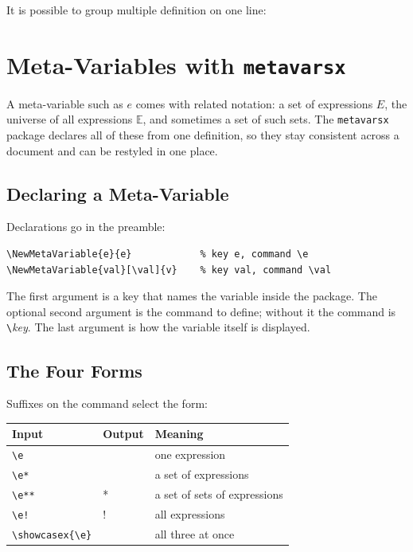 \documentclass{article}
\begin{document}
It is possible to group multiple definition on one line:
\begin{syntax}

\end{syntax}

\section{Meta-Variables with \texttt{metavarsx}}

A meta-variable such as $e$ comes with related notation: a set of
expressions $E$, the universe of all expressions $\mathbb{E}$, and
sometimes a set of such sets. The \texttt{metavarsx} package declares
all of these from one definition, so they stay consistent across a
document and can be restyled in one place.

\subsection{Declaring a Meta-Variable}

Declarations go in the preamble:
\begin{verbatim}
\NewMetaVariable{e}{e}            % key e, command \e
\NewMetaVariable{val}[\val]{v}    % key val, command \val
\end{verbatim}
The first argument is a key that names the variable inside the package.
The optional second argument is the command to define; without it the
command is \verb|\|\textit{key}. The last argument is how the variable
itself is displayed.

\subsection{The Four Forms}

Suffixes on the command select the form:

\begin{center}
  \begin{tabular}{@{}lll@{}}
    \toprule
    Input           & Output         & Meaning \\
    \midrule
    \verb|\e|       & \e             & one expression \\
    \verb|\e*|      & \e*            & a set of expressions \\
    \verb|\e**|     & \e**           & a set of sets of expressions \\
    \verb|\e!|      & \e!            & all expressions \\
    \verb|\showcasex{\e}| & \showcasex{\e} & all three at once \\
    \bottomrule
  \end{tabular}
\end{center}
\end{document}
